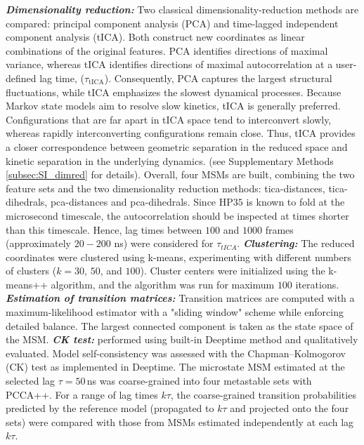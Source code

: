 \documentclass[prl,twocolumn]{revtex4-1}
\begin{document}
\newline \textbf{\textit{Dimensionality reduction:}}
Two classical dimensionality-reduction methods are compared: principal component analysis (PCA) and time-lagged independent component analysis (tICA). Both construct new coordinates as linear combinations of the original features. PCA identifies directions of maximal variance, whereas tICA identifies directions of maximal autocorrelation at a user-defined lag time, ($\tau_{\mathrm{tICA}}$). Consequently, PCA captures the largest structural fluctuations, while tICA emphasizes the slowest dynamical processes.
Because Markov state models aim to resolve slow kinetics, tICA is generally preferred. Configurations that are far apart in tICA space tend to interconvert slowly, whereas rapidly interconverting configurations remain close. Thus, tICA provides a closer correspondence between geometric separation in the reduced space and kinetic separation in the underlying dynamics. (see Supplementary Methods \ref{subsec:SI_dimred} for details). Overall, four MSMs are built, combining the two feature sets and the two dimensionality reduction methods: tica-distances, tica-dihedrals, pca-distances and pca-dihedrals. Since HP$35$ is known to fold at the microsecond timescale, 
the autocorrelation should be inspected at times shorter than this timescale. Hence, lag times between $100$ and $1000$ frames (approximately $20-200$ ns) were considered for $\tau_{tICA}$.
\vspace{0.1em}\newline
\textbf{\textit{Clustering:}}
The reduced coordinates were clustered using k-means, experimenting with different numbers of clusters ($k = 30$, $50$, and $100$). Cluster centers were initialized using the k-means++ algorithm, and the algorithm was run for maximum $100$ iterations. 
\vspace{0.1em}\newline
\textbf{\textit{Estimation of transition matrices:}}
Transition matrices are computed with a maximum-likelihood estimator with a "sliding window" scheme  \cite[Chap. 4.1]{thebible} while enforcing detailed balance.
The largest connected component is taken as the state space of the MSM.
\vspace{0.1em}\newline
\textbf{\textit{CK test:}} performed using built-in Deeptime method and qualitatively evaluated.
Model self-consistency was assessed with the Chapman--Kolmogorov (CK) test as
implemented in Deeptime. The microstate MSM estimated at the selected lag
$\tau = 50$\,ns was coarse-grained into four metastable sets with PCCA++. For a
range of lag times $k\tau$, the coarse-grained transition probabilities predicted
by the reference model (propagated to $k\tau$ and projected onto the four sets)
were compared with those from MSMs estimated independently at each lag $k\tau$.
%
%
\end{document}
